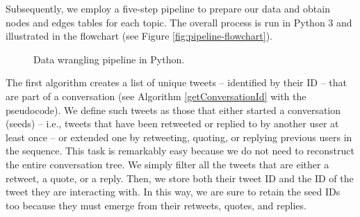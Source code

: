Subsequently, we employ a five-step pipeline to prepare our data and obtain nodes and edges tables for each topic. The overall process is run in Python 3 and illustrated in the flowchart (see Figure \vref{fig:pipeline-flowchart}).
\begin{figure}
  \centering{}\caption{Data wrangling pipeline in Python.\label{fig:pipeline-flowchart}}
  \begin{center}
  \end{center}
\end{figure}
The first algorithm creates a list of unique tweets – identified by their ID – that are part of a conversation (see Algorithm \vref{getConversationId} with the pseudocode). We define such tweets as those that either started a conversation (seeds) – i.e., tweets that have been retweeted or replied to by another user at least once – or extended one by retweeting, quoting, or replying previous users in the sequence. This task is remarkably easy because we do not need to reconstruct the entire conversation tree. We simply filter all the tweets that are either a retweet, a quote, or a reply. Then, we store both their tweet ID and the ID of the tweet they are interacting with. In this way, we are sure to retain the seed IDs too because they must emerge from their retweets, quotes, and replies.
